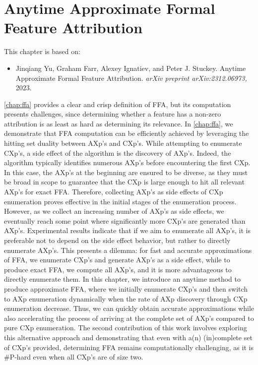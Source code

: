 \chapter{Anytime Approximate Formal Feature Attribution}\label{chap:marco}


This chapter is based on:
\begin{itemize}
	\item Jinqiang Yu, Graham Farr, Alexey Ignatiev, and Peter J. Stuckey. Anytime Approximate Formal
Feature Attribution. \emph{arXiv preprint arXiv:2312.06973,} 2023.
\end{itemize}

\autoref{chap:ffa} provides a clear and crisp definition of FFA, but its computation presents
challenges,
since determining whether a feature has a non-zero attribution is as
least as hard as determining its relevance.
%
In \autoref{chap:ffa}, we demonstrate that FFA computation can be efficiently achieved 
by leveraging the hitting set duality between AXp's and CXp's.
%
While attempting to enumerate CXp's, a side effect of the algorithm is 
the discovery of AXp's. 
%
Indeed, the algorithm typically identifies numerous AXp's before encountering the first CXp.
%
In this case, the AXp's at the beginning are ensured to be diverse, as they must be broad in scope
to guarantee that the CXp is large enough to hit all relevant AXp's for exact FFA.
%
Therefore, collecting AXp's as side effects of CXp enumeration proves effective in the 
initial stages of the enumeration process.
%
However, as we collect an increasing number of AXp's as side effects, we eventually 
reach some point where significantly more CXp's are generated than AXp's.
%
Experimental results indicate that if we aim to enumerate all AXp's, it is preferable not to 
depend on the side effect behavior, but rather to directly enumerate AXp's.
%
This presents a dilemma: for fast and accurate approximations of FFA, we enumerate CXp's and
generate AXp's as a side effect, while to produce exact FFA, we compute all AXp's, and it is more 
advantageous to directly enumerate them.
%
In this chapter, we introduce an anytime method to produce approximate FFA,
where we initially enumerate CXp's and then switch to AXp enumeration dynamically 
when the rate of AXp discovery through CXp enumeration decrease.
%
Thus, we can quickly obtain accurate approximations while also accelerating the process of 
arriving at the complete set of AXp's compared to pure CXp enumeration.
%
The second contribution of this work involves exploring this alternative approach 
and demonstrating that even with a(n) (in)complete set of CXp's provided, 
determining FFA remains computationally challenging, as it is \#P-hard even when 
all CXp's are of size two.


%

%
